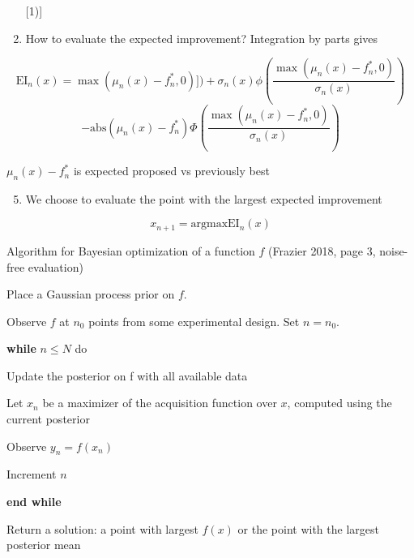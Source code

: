 \documentclass[
  ignorenonframetext,
]{beamer}
\providecommand{\tightlist}{%
  \setlength{\itemsep}{0pt}\setlength{\parskip}{0pt}}
\begin{document}
\begin{frame}
\begin{enumerate}
[1)]
\setcounter{enumi}{3}
\tightlist
\item
  How to evaluate the expected improvement? Integration by parts gives
\end{enumerate}

\[ \text{EI}_n(x)=\max(\mu_n(x)-f^{*}_n,0)])+\sigma_n(x) \phi(\frac{\max(\mu_n(x)-f^{*}_n,0)}{\sigma_n(x)}) \]
\[-\text{abs}(\mu_n(x)-f^{*}_n) \Phi(\frac{\max(\mu_n(x)-f^{*}_n,0)}{\sigma_n(x)})\]

\(\mu_n(x)-f^{*}_n\) is expected proposed vs previously best

\begin{enumerate}
[1)]
\setcounter{enumi}{4}
\tightlist
\item
  We choose to evaluate the point with the largest expected improvement
\end{enumerate}

\[ x_{n+1}=\text{argmax}\text{EI}_n(x)\]
\end{frame}

\begin{frame}
\begin{block}{Algorithm for Bayesian optimization of a function \(f\)}
\protect\hypertarget{algorithm-for-bayesian-optimization-of-a-function-f}{}
(Frazier 2018, page 3, noise-free evaluation)
\end{block}
\end{frame}

\begin{frame}
Place a Gaussian process prior on \(f\).

Observe \(f\) at \(n_0\) points from some experimental design. Set
\(n=n_0\).

\textbf{while} \(n \le N\) do

Update the posterior on f with all available data

Let \(x_n\) be a maximizer of the acquisition function over \(x\),
computed using the current posterior

Observe \(y_n=f(x_n)\)

Increment \(n\)

\textbf{end while}

Return a solution: a point with largest \(f(x)\) or the point with the
largest posterior mean
\end{frame}
\end{document}

